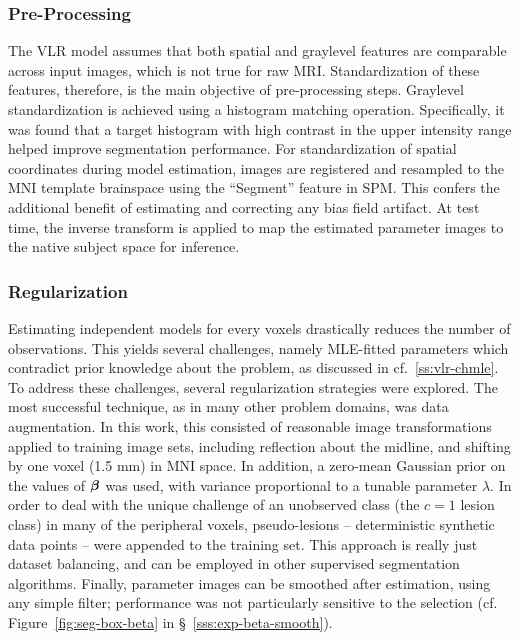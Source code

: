\subsubsection{Pre-Processing}
The VLR model assumes that both spatial and graylevel features are comparable across input images,
which is not true for raw MRI.
Standardization of these features, therefore, is the main objective of pre-processing steps.
Graylevel standardization is achieved using a histogram matching operation.
Specifically, it was found that a target histogram with high contrast in the upper intensity range
helped improve segmentation performance.
For standardization of spatial coordinates during model estimation,
images are registered and resampled to the MNI template brainspace
using the ``Segment'' feature in SPM.
This confers the additional benefit of estimating and correcting any bias field artifact.
At test time, the inverse transform is applied to map the estimated parameter images
to the native subject space for inference.
\subsubsection{Regularization}
Estimating independent models for every voxels drastically reduces the number of observations.
This yields several challenges, namely MLE-fitted parameters which
contradict prior knowledge about the problem, as discussed in cf.~\ref{ss:vlr-chmle}.
To address these challenges, several regularization strategies were explored.
The most successful technique, as in many other problem domains, was data augmentation.
In this work, this consisted of reasonable image transformations
applied to training image sets, including
reflection about the midline,
and shifting by one voxel (1.5 mm) in MNI space.
In addition, a zero-mean Gaussian prior on the values of $\bm{\beta}$ was used,
with variance proportional to a tunable parameter $\lambda$.
In order to deal with the unique challenge of an unobserved class (the $c=1$ lesion class)
in many of the peripheral voxels,
pseudo-lesions -- deterministic synthetic data points --
were appended to the training set.
This approach is really just dataset balancing,
and can be employed in other supervised segmentation algorithms.
Finally, parameter images can be smoothed after estimation, using any simple filter;
performance was not particularly sensitive to the selection
(cf. Figure~\ref{fig:seg-box-beta} in \S~\ref{sss:exp-beta-smooth}).
